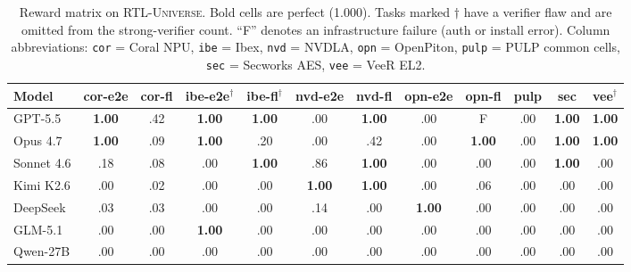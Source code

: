 \documentclass{article}
\begin{document}
\begin{table}[t]
\centering
\caption{Reward matrix on \textsc{RTL-Universe}. Bold cells are perfect (1.000). Tasks
marked $\dagger$ have a verifier flaw and are omitted from the strong-verifier count. ``F''
denotes an infrastructure failure (auth or install error). Column abbreviations:
\texttt{cor} = Coral NPU, \texttt{ibe} = Ibex, \texttt{nvd} = NVDLA, \texttt{opn} =
OpenPiton, \texttt{pulp} = PULP common cells, \texttt{sec} = Secworks AES, \texttt{vee} =
VeeR EL2.}
\label{tab:matrix}
\footnotesize
\setlength{\tabcolsep}{3pt}
\begin{tabular}{l c c c c c c c c c c c}
\toprule
Model & cor-e2e & cor-fl & ibe-e2e$^\dagger$ & ibe-fl$^\dagger$ & nvd-e2e & nvd-fl & opn-e2e & opn-fl & pulp & sec & vee$^\dagger$ \\
\midrule
GPT-5.5      & \textbf{1.00} & .42 & \textbf{1.00} & \textbf{1.00} & .00 & \textbf{1.00} & .00 & F          & .00 & \textbf{1.00} & \textbf{1.00} \\
Opus 4.7     & \textbf{1.00} & .09 & \textbf{1.00} & .20            & .00 & .42            & .00 & \textbf{1.00} & .00 & \textbf{1.00} & \textbf{1.00} \\
Sonnet 4.6   & .18            & .08 & .00            & \textbf{1.00} & .86 & \textbf{1.00} & .00 & .00            & .00 & \textbf{1.00} & .00 \\
Kimi K2.6    & .00            & .02 & .00            & .00            & \textbf{1.00} & \textbf{1.00} & .00 & .06 & .00 & .00 & .00 \\
DeepSeek     & .03            & .03 & .00            & .00            & .14 & .00            & \textbf{1.00} & .00 & .00 & .00 & .00 \\
GLM-5.1      & .00            & .00 & \textbf{1.00} & .00            & .00 & .00            & .00 & .00            & .00 & .00 & .00 \\
Qwen-27B     & .00            & .00 & .00            & .00            & .00 & .00            & .00 & .00            & .00 & .00 & .00 \\
\bottomrule
\end{tabular}
\end{table}
\end{document}
